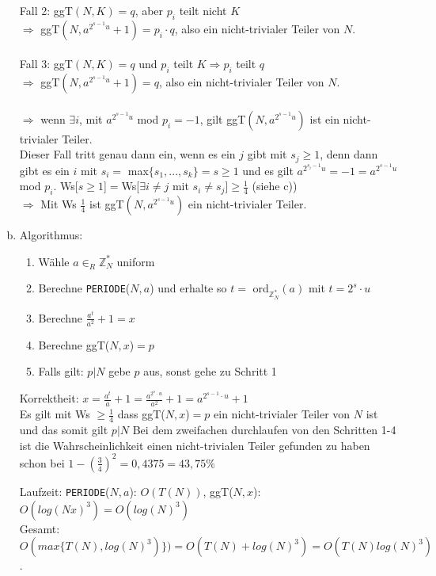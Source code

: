 \documentclass[a4paper]{scrartcl}
\begin{document}
\begin{enumerate}[a)]
Fall 2: ggT$(N, K)=q$, aber $p_i$ teilt nicht $K$\\

$\Rightarrow$ ggT$(N, a^{2^{s-1}u}+1) = p_i \cdot q$, also ein nicht-trivialer Teiler von $N$. \\\\
 
Fall 3:  ggT$(N,K)=q$ und $p_i$ teilt $K \Rightarrow p_i$ teilt $q$ \\
$\Rightarrow$ ggT$(N, a^{2^{s-1}u}+1) = q$, also ein nicht-trivialer Teiler von $N$. \\\\

$\Rightarrow$ wenn $\exists i$, mit $a^{2^{s-1}u}$ mod $p_i=-1$, gilt ggT$(N, a^{2^{s-1}u})$ ist ein nicht-trivialer Teiler.\\
Dieser Fall tritt genau dann ein, wenn es ein $j$ gibt mit $s_j\geq 1$, denn dann gibt es ein $i$ mit $s_i=$ max$\{s_1, ..., s_k\}=s\geq 1$ und es gilt $a^{2^{s_i-1}u} =-1 = a^{2^{s-1}u}$ mod $p_i$.
Ws[$ s\geq 1$]$=$Ws[$\exists i \neq j$ mit $s_i \neq s_j$]$\geq\frac{1}{4}$ (siehe c))\\
$\Rightarrow$ Mit Ws $\frac{1}{4}$ ist ggT$(N, a^{2^{s-1}u})$ ein nicht-trivialer Teiler.



\item
Algorithmus:\\
\begin{enumerate}[1.]
\item Wähle $a\in_R \mathbb{Z}_N^*$ uniform
\item Berechne \texttt{PERIODE}($N,a$) und erhalte so $t =$ ord$_{\mathbb{Z}_N^*}(a)$ mit $t=2^s\cdot u$
\item Berechne $\frac{a^t}{a^2}+1=x$
\item Berechne ggT($N, x$)$=p$
\item Falls gilt: $p | N$ gebe $p$ aus, sonst gehe zu Schritt 1
\end{enumerate}

Korrektheit:
$x=\frac{a^t}{a}+1= \frac{a^{2^s\cdot u}}{a^2}+1= a^{2^{s-1}\cdot u}+1$\\
Es gilt mit Ws $\geq \frac{1}{4}$ dass ggT($N, x$)$=p$ ein nicht-trivialer Teiler von $N$ ist und das somit gilt $p|N$
Bei dem zweifachen durchlaufen von den Schritten 1-4 ist die Wahrscheinlichkeit einen nicht-trivialen Teiler gefunden zu haben schon bei $1-(\frac{3}{4})^2=0,4375=43,75 \%$

Laufzeit: \texttt{PERIODE}($N,a$): $O(T(N))$, ggT($N,x$): $O(log(Nx)^3)=O(log(N)^3)$\\
Gesamt: $O(max\{T(N),log(N)^3)\})=O(T(N)+log(N)^3)=O(T(N)log(N)^3)$.



\end{enumerate}
\end{document}

